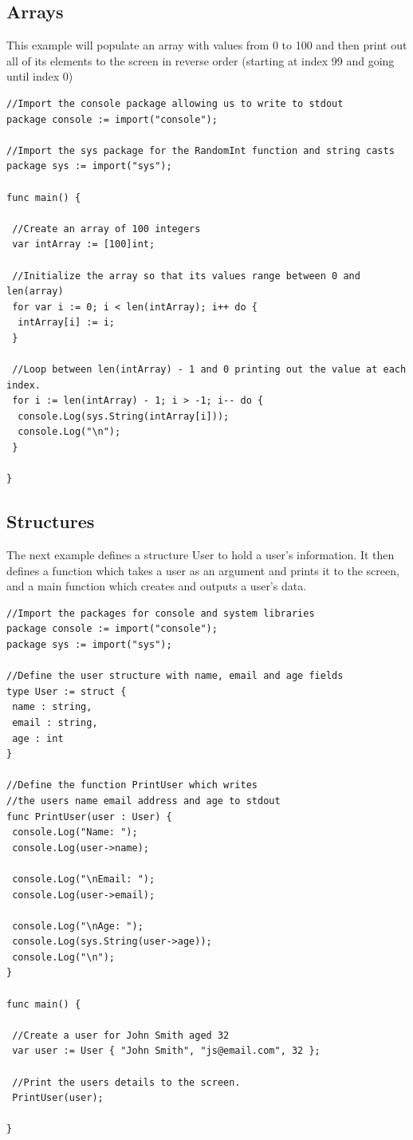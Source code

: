 \documentclass[]{final_report}
\begin{document}
\subsection{Arrays}

This example will populate an array with values from 0 to 100 and then print out all of its elements to the screen in reverse order (starting at index 99 and going until index 0)

\begin{verbatim}
//Import the console package allowing us to write to stdout
package console := import("console");

//Import the sys package for the RandomInt function and string casts
package sys := import("sys");

func main() {

 //Create an array of 100 integers
 var intArray := [100]int;

 //Initialize the array so that its values range between 0 and len(array)
 for var i := 0; i < len(intArray); i++ do {
  intArray[i] := i;
 }

 //Loop between len(intArray) - 1 and 0 printing out the value at each index.
 for i := len(intArray) - 1; i > -1; i-- do {
  console.Log(sys.String(intArray[i]));
  console.Log("\n");
 }

}
\end{verbatim}

\subsection{Structures}

The next example defines a structure User to hold a user's information. It then defines a function which takes a user as an argument and prints it to the screen, and a main function which creates and outputs a user's data.

\begin{verbatim}
//Import the packages for console and system libraries
package console := import("console");
package sys := import("sys");

//Define the user structure with name, email and age fields
type User := struct {
 name : string,
 email : string,
 age : int
}

//Define the function PrintUser which writes 
//the users name email address and age to stdout
func PrintUser(user : User) {
 console.Log("Name: ");
 console.Log(user->name);
 
 console.Log("\nEmail: ");
 console.Log(user->email);
 
 console.Log("\nAge: ");
 console.Log(sys.String(user->age));
 console.Log("\n");
}

func main() {
 
 //Create a user for John Smith aged 32
 var user := User { "John Smith", "js@email.com", 32 };

 //Print the users details to the screen.
 PrintUser(user);

}
\end{verbatim}
\end{document}
